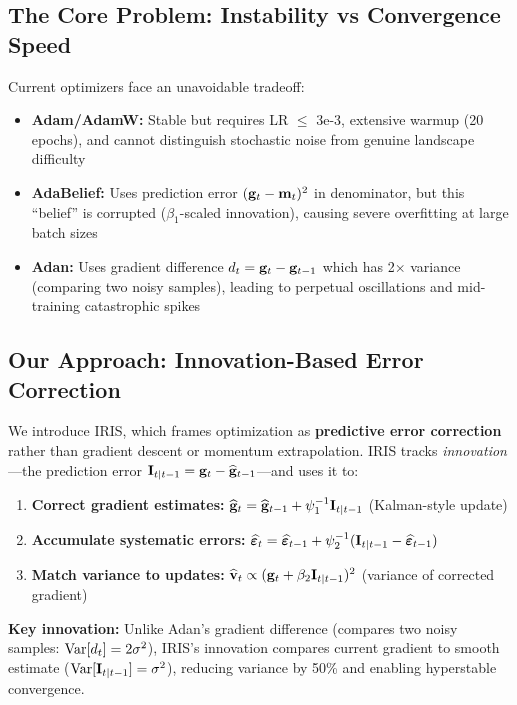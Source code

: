 \subsection{The Core Problem: Instability vs Convergence Speed}

Current optimizers face an unavoidable tradeoff:
\begin{itemize}
    \item \textbf{Adam/AdamW:} Stable but requires LR $\leq$ 3e-3, extensive warmup (20 epochs), and cannot distinguish stochastic noise from genuine landscape difficulty
    \item \textbf{AdaBelief:} Uses prediction error $(\mathbf{g}_t - \mathbf{m}_t)^2$ in denominator, but this ``belief'' is corrupted ($\beta_1$-scaled innovation), causing severe overfitting at large batch sizes
    \item \textbf{Adan:} Uses gradient difference $d_t = \mathbf{g}_t - \mathbf{g}_{t-1}$ which has 2$\times$ variance (comparing two noisy samples), leading to perpetual oscillations and mid-training catastrophic spikes
\end{itemize}

\subsection{Our Approach: Innovation-Based Error Correction}

We introduce IRIS, which frames optimization as \textbf{predictive error correction} rather than gradient descent or momentum extrapolation. IRIS tracks \emph{innovation}---the prediction error $\mathbf{I}_{t|t-1} = \mathbf{g}_t - \widehat{\mathbf{g}}_{t-1}$---and uses it to:
\begin{enumerate}
    \item \textbf{Correct gradient estimates:} $\widehat{\mathbf{g}}_t = \widehat{\mathbf{g}}_{t-1} + \psi_1^{-1} \mathbf{I}_{t|t-1}$ (Kalman-style update)
    \item \textbf{Accumulate systematic errors:} $\widehat{\bm{\varepsilon}}_t = \widehat{\bm{\varepsilon}}_{t-1} + \psi_2^{-1}(\mathbf{I}_{t|t-1} - \widehat{\bm{\varepsilon}}_{t-1})$
    \item \textbf{Match variance to updates:} $\widehat{\mathbf{v}}_t \propto (\mathbf{g}_t + \beta_2 \mathbf{I}_{t|t-1})^2$ (variance of corrected gradient)
\end{enumerate}

\textbf{Key innovation:} Unlike Adan's gradient difference (compares two noisy samples: $\operatorname{Var}[d_t] = 2\sigma^2$), IRIS's innovation compares current gradient to smooth estimate ($\operatorname{Var}[\mathbf{I}_{t|t-1}] = \sigma^2$), reducing variance by 50\% and enabling hyperstable convergence.

